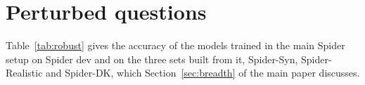 \section{Perturbed questions}\label{sup:perturbed}

Table~\ref{tab:robust} gives the accuracy of the models trained in the
main Spider setup on Spider dev and on the three sets built from it,
Spider-Syn, Spider-Realistic and Spider-DK, which
Section~\ref{sec:breadth} of the main paper discusses.

\begin{table}[!ht]
\caption{EX and TS (\%) on Spider dev and the three sets built from
Spider after  rounds. TS uses the official suite of
the Spider dev databases, and Spider-DK has none. The lower part gives
$\Delta$ and $p$ of \method{} against FedAvg SFT and against \method{}
without warm-up rounds, as in Table~\ref{tab:main}.}\label{tab:robust}
\footnotesize

\end{table}

